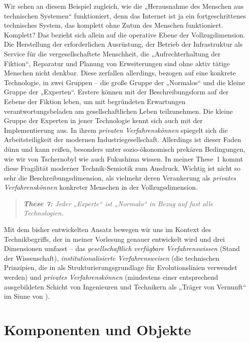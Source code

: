 \documentclass[12pt,a4paper]{article}
\begin{document}
Wir sehen an diesem Beispiel zugleich, wie die „Herausnahme des Menschen aus
technischen Systemen“ funktioniert, denn das Internet ist ja ein
fortgeschrittenes technisches System, das komplett ohne Zutun des Menschen
funktioniert. Komplett?  Das bezieht sich allein auf die operative Ebene der
Vollzugdimension. Die Herstellung der erforderlichen Ausrüstung, der Betrieb
der Infrastruktur als Service für die vergesellschaftete Menschheit, die
„Aufrechterhaltung der Fiktion“, Reparatur und Planung von Erweiterungen sind
ohne aktiv tätige Menschen nicht denkbar. Diese zerfallen allerdings, bezogen
auf eine konkrete Technologie, in zwei Gruppen -- die große Gruppe der
„Normalos“ und die kleine Gruppe der „Experten“. Erstere können mit der
Beschreibungsform auf der Eebene der Fiktion leben, um mit begründeten
Erwartungen verantwortungsbeladen am gesellschaftlichen Leben teilzunehmen.
Die kleine Gruppe der Experten in jener Technologie kennt sich auch mit der
Implementierung aus. In ihrem \emph{privaten Verfahrenskönnen} spiegelt sich
die Arbeitsteiligkeit der modernen Industriegesellschaft.  Allerdings ist
dieser Faden dünn und kann reißen, besonders unter sozio-ökonomisch prekären
Bedingungen, wie wir von Tschernobyl wie auch Fukushima wissen. In meiner
These~1 kommt diese Fragilität moderner Technik-Semiotik zum Ausdruck. Wichtig
ist nicht so sehr die Beschreibungsdimension, als vielmehr deren Verankerung
als \emph{privates Verfahrenskönnen} konkreter Menschen in der
Vollzugsdimension.
\begin{quote}\it
  \textbf{These 7:} Jeder „Experte“ ist „Normalo“ in Bezug auf fast alle
  Technologien. 
\end{quote}
Mit dem bisher entwickelten Ansatz bewegen wir uns im Kontext des
Technikbegriffs, der in meiner Vorlesung genauer entwickelt wird und drei
Dimensionen umfasst -- das \emph{gesellschaftlich verfügbare Verfahrenswissen}
(Stand der Wissenschaft), \emph{institutionalisierte Verfahrensweisen} (die
technischen Prinzipien, die in \cite{Shpakovsky2010} als
Strukturierungsgrundlage für Evolutionslinien verwendet werden) und
\emph{privates Verfahrenskönnen} (mindestens einer entsprechend ausgebildeten
Schicht von Ingenieuren und Technikern als „Träger von Vernunft“ im Sinne von
\cite{Vernadsky2001}).

\section{Komponenten und Objekte}
\end{document}
